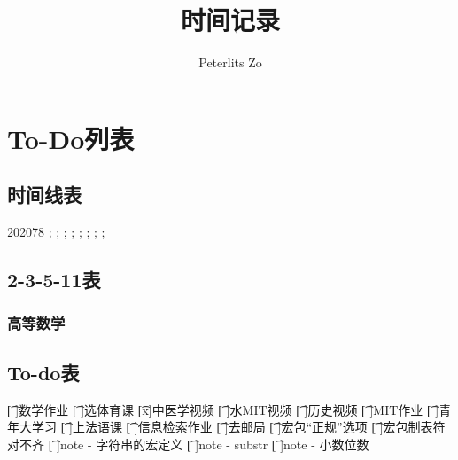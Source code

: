 \documentclass{peterlitsdoc}
\title{时间记录}
\author{Peterlits Zo}
\begin{document}
\maketitle
\tableofcontents
\newpage


\section{To-Do列表}

\subsection{时间线表}

\begin{plttimeline}{2020}{7}{8}
    ;
    ;
    ;
    ;
    ;
    ;
    ;
    ;
\end{plttimeline}

\subsection{2-3-5-11表}

\subsubsection{高等数学}



\subsection{To-do表}

\begin{plttodoenv}{4}
\t[ ]数学作业      
\t[ ]选体育课      
\t[x]中医学视频
\t[ ]水MIT视频                         
\t[ ]历史视频
\t[ ]MIT作业       
\t[ ]青年大学习                        
\t[ ]上法语课
\t[ ]信息检索作业  
\t[ ]去邮局        
\t[ ]宏包“正规”选项
\t[ ]宏包制表符对不齐
    \t[ ]note - 字符串的宏定义
    \t[ ]note - substr
    \t[ ]note - 小数位数
\end{plttodoenv}
\end{document}
